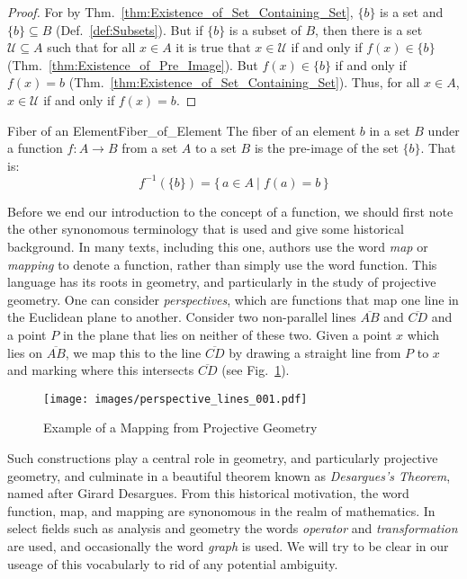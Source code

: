         \begin{proof}
            For by Thm.~\ref{thm:Existence_of_Set_Containing_Set}, $\{b\}$ is
            a set and $\{b\}\subseteq{B}$ (Def.~\ref{def:Subsets}). But if
            $\{b\}$ is a subset of $B$, then there is a set
            $\mathcal{U}\subseteq{A}$ such that for all $x\in{A}$ it is true
            that $x\in\mathcal{U}$ if and only if $f(x)\in\{b\}$
            (Thm.~\ref{thm:Existence_of_Pre_Image}). But $f(x)\in\{b\}$ if and
            only if $f(x)=b$ (Thm.~\ref{thm:Existence_of_Set_Containing_Set}).
            Thus, for all $x\in{A}$, $x\in\mathcal{U}$ if and only if $f(x)=b$.
        \end{proof}
        \begin{fdefinition}{Fiber of an Element}{Fiber_of_Element}
            The \gls{fiber} of an element $b$ in a \gls{set} $B$ under a
            \gls{function} $f:A\rightarrow{B}$ from a set $A$ to a set $B$ is
            the pre-image of the set $\{b\}$. That is:
            \begin{equation*}
                f^{\minus{1}}(\{b\})
                =\big\{\,a\in{A}\:|\;f(a)=b\,\big\}
            \end{equation*}
        \end{fdefinition}
        Before we end our introduction to the concept of a function, we should
        first note the other synonomous terminology that is used and give some
        historical background. In many texts, including this one, authors use
        the word \textit{map} or \textit{mapping} to denote a function, rather
        than simply use the word function. This language has its roots in
        geometry, and particularly in the study of projective geometry. One can
        consider \textit{perspectives}, which are functions that map one line in
        the Euclidean plane to another. Consider two non-parallel lines
        $\overline{AB}$ and $\overline{CD}$ and a point $P$ in the plane that
        lies on neither of these two. Given a point $x$ which lies on
        $\overline{AB}$, we map this to the line $\overline{CD}$ by drawing a
        straight line from $P$ to $x$ and marking where this intersects
        $\overline{CD}$
        (see Fig.~\ref{fig:Example_of_Map_from_Projective_Geometry}).
        \begin{figure}[H]
            \centering
            \captionsetup{type=figure}
            \texttt{[image: images/perspective\_lines\_001.pdf]}
            \caption{Example of a Mapping from Projective Geometry}
            \label{fig:Example_of_Map_from_Projective_Geometry}
        \end{figure}
        Such constructions play a central role in geometry, and particularly
        projective geometry, and culminate in a beautiful theorem known as
        \textit{Desargues's Theorem}, named after
        Girard Desargues. From this historical motivation, the word function,
        map, and mapping are synonomous in the realm of mathematics. In select
        fields such as analysis and geometry the words \textit{operator} and
        \textit{transformation} are used, and occasionally the word
        \textit{graph} is used. We will try to be clear in our useage of this
        vocabularly to rid of any potential ambiguity.
